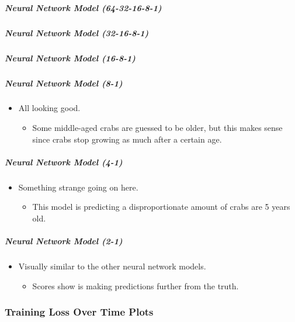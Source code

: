 \documentclass[11pt]{article}
\providecommand{\tightlist}{%
      \setlength{\itemsep}{0pt}\setlength{\parskip}{0pt}}
\begin{document}
\subparagraph{Neural Network Model
(64-32-16-8-1)}\label{neural-network-model-64-32-16-8-1}

\subparagraph{Neural Network Model
(32-16-8-1)}\label{neural-network-model-32-16-8-1}

\subparagraph{Neural Network Model
(16-8-1)}\label{neural-network-model-16-8-1}

\subparagraph{Neural Network Model
(8-1)}\label{neural-network-model-8-1}

\begin{itemize}
\tightlist
\item
  All looking good.

  \begin{itemize}
  \tightlist
  \item
    Some middle-aged crabs are guessed to be older, but this makes sense
    since crabs stop growing as much after a certain age.
  \end{itemize}
\end{itemize}

\subparagraph{Neural Network Model
(4-1)}\label{neural-network-model-4-1}

\begin{itemize}
\tightlist
\item
  Something strange going on here.

  \begin{itemize}
  \tightlist
  \item
    This model is predicting a disproportionate amount of crabs are 5
    years old.
  \end{itemize}
\end{itemize}

\subparagraph{Neural Network Model
(2-1)}\label{neural-network-model-2-1}

\begin{itemize}
\tightlist
\item
  Visually similar to the other neural network models.

  \begin{itemize}
  \tightlist
  \item
    Scores show is making predictions further from the truth.
  \end{itemize}
\end{itemize}

    \subsubsection{Training Loss Over Time
Plots}\label{training-loss-over-time-plots}
\end{document}
